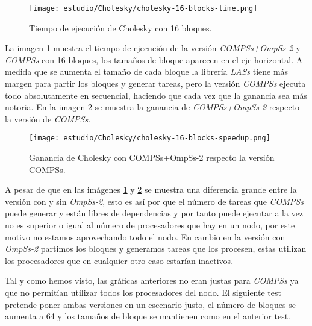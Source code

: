 \par\bigskip

\begin{figure}[H]
	\centering 
	\caption{Tiempo de ejecución de Cholesky con 16 bloques.}
	\texttt{[image: estudio/Cholesky/cholesky-16-blocks-time.png]}
	\label{fig:cholesky-16-time}
\end{figure}

La imagen \ref{fig:cholesky-16-time} muestra el tiempo de ejecución de la versión \textit{COMPSs+OmpSs-2} y \textit{COMPSs} con 16 bloques, los tamaños de bloque aparecen en el eje horizontal. A medida que se aumenta el tamaño de cada bloque la librería \textit{LASs} tiene más margen para partir los bloques y generar tareas, pero la versión \textit{COMPSs} ejecuta todo absolutamente en secuencial, haciendo que cada vez que la ganancia sea más notoria. En la imagen \ref{fig:cholesky-16-speedup} se muestra la ganancia de \textit{COMPSs+OmpSs-2} respecto la versión de \textit{COMPSs}.

\par\bigskip

\begin{figure}[H]
	\centering 
	\caption{Ganancia de Cholesky con COMPSs+OmpSs-2 respecto la versión COMPSs.}
	\texttt{[image: estudio/Cholesky/cholesky-16-blocks-speedup.png]}
	\label{fig:cholesky-16-speedup}
\end{figure}

A pesar de que en las imágenes \ref{fig:cholesky-16-time} y \ref{fig:cholesky-16-speedup} se muestra una diferencia grande entre la versión con y sin \textit{OmpSs-2}, esto es así por que el número de tareas que \textit{COMPSs} puede generar y están libres de dependencias y por tanto puede ejecutar a la vez no es superior o igual al número de procesadores que hay en un nodo, por este motivo no estamos aprovechando todo el nodo. En cambio en la versión con \textit{OmpSs-2} partimos los bloques y generamos tareas que los procesen, estas utilizan los procesadores que en cualquier otro caso estarían inactivos.

\par\bigskip

Tal y como hemos visto, las gráficas anteriores no eran justas para \textit{COMPSs} ya que no permitían utilizar todos los procesadores del nodo. El siguiente test pretende poner ambas versiones en un escenario justo, el número de bloques se aumenta a 64 y los tamaños de bloque se mantienen como en el anterior test.
\par\bigskip

